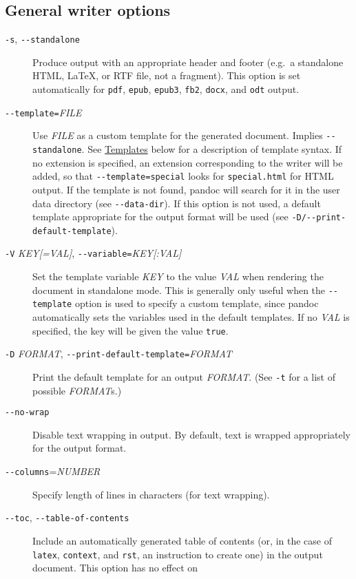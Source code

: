 \documentclass[]{article}
\begin{document}
\subsection{General writer options}

\begin{description}
\item[\texttt{-s}, \texttt{-{}-standalone}]
Produce output with an appropriate header and footer (e.g.~a standalone
HTML, LaTeX, or RTF file, not a fragment). This option is set
automatically for \texttt{pdf}, \texttt{epub}, \texttt{epub3},
\texttt{fb2}, \texttt{docx}, and \texttt{odt} output.
\item[\texttt{-{}-template=}\emph{FILE}]
Use \emph{FILE} as a custom template for the generated document. Implies
\texttt{-{}-standalone}. See \hyperref[templates]{Templates} below for a
description of template syntax. If no extension is specified, an
extension corresponding to the writer will be added, so that
\texttt{-{}-template=special} looks for \texttt{special.html} for HTML
output. If the template is not found, pandoc will search for it in the
user data directory (see \texttt{-{}-data-dir}). If this option is not
used, a default template appropriate for the output format will be used
(see \texttt{-D/-{}-print-default-template}).
\item[\texttt{-V} \emph{KEY{[}=VAL{]}},
\texttt{-{}-variable=}\emph{KEY{[}:VAL{]}}]
Set the template variable \emph{KEY} to the value \emph{VAL} when
rendering the document in standalone mode. This is generally only useful
when the \texttt{-{}-template} option is used to specify a custom
template, since pandoc automatically sets the variables used in the
default templates. If no \emph{VAL} is specified, the key will be given
the value \texttt{true}.
\item[\texttt{-D} \emph{FORMAT},
\texttt{-{}-print-default-template=}\emph{FORMAT}]
Print the default template for an output \emph{FORMAT}. (See \texttt{-t}
for a list of possible \emph{FORMAT}s.)
\item[\texttt{-{}-no-wrap}]
Disable text wrapping in output. By default, text is wrapped
appropriately for the output format.
\item[\texttt{-{}-columns}=\emph{NUMBER}]
Specify length of lines in characters (for text wrapping).
\item[\texttt{-{}-toc}, \texttt{-{}-table-of-contents}]
Include an automatically generated table of contents (or, in the case of
\texttt{latex}, \texttt{context}, and \texttt{rst}, an instruction to
create one) in the output document. This option has no effect on

\end{description}
\end{document}
